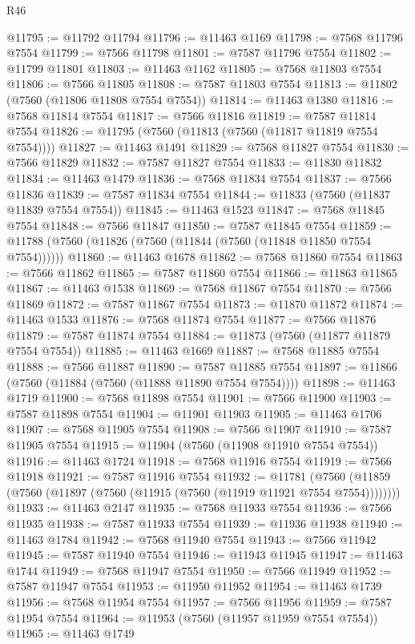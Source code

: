 \begin{lexlean}{R46}
\begin{coremodule}
@11795 := @11792 @11794
@11796 := @11463 @1169
@11798 := @7568 @11796 @7554
@11799 := @7566 @11798
@11801 := @7587 @11796 @7554
@11802 := @11799 @11801
@11803 := @11463 @1162
@11805 := @7568 @11803 @7554
@11806 := @7566 @11805
@11808 := @7587 @11803 @7554
@11813 := @11802 (@7560 (@11806 @11808 @7554 @7554))
@11814 := @11463 @1380
@11816 := @7568 @11814 @7554
@11817 := @7566 @11816
@11819 := @7587 @11814 @7554
@11826 := @11795 (@7560 (@11813 (@7560 (@11817 @11819 @7554 @7554))))
@11827 := @11463 @1491
@11829 := @7568 @11827 @7554
@11830 := @7566 @11829
@11832 := @7587 @11827 @7554
@11833 := @11830 @11832
@11834 := @11463 @1479
@11836 := @7568 @11834 @7554
@11837 := @7566 @11836
@11839 := @7587 @11834 @7554
@11844 := @11833 (@7560 (@11837 @11839 @7554 @7554))
@11845 := @11463 @1523
@11847 := @7568 @11845 @7554
@11848 := @7566 @11847
@11850 := @7587 @11845 @7554
@11859 := @11788 (@7560 (@11826 (@7560 (@11844 (@7560 (@11848 @11850 @7554 @7554))))))
@11860 := @11463 @1678
@11862 := @7568 @11860 @7554
@11863 := @7566 @11862
@11865 := @7587 @11860 @7554
@11866 := @11863 @11865
@11867 := @11463 @1538
@11869 := @7568 @11867 @7554
@11870 := @7566 @11869
@11872 := @7587 @11867 @7554
@11873 := @11870 @11872
@11874 := @11463 @1533
@11876 := @7568 @11874 @7554
@11877 := @7566 @11876
@11879 := @7587 @11874 @7554
@11884 := @11873 (@7560 (@11877 @11879 @7554 @7554))
@11885 := @11463 @1669
@11887 := @7568 @11885 @7554
@11888 := @7566 @11887
@11890 := @7587 @11885 @7554
@11897 := @11866 (@7560 (@11884 (@7560 (@11888 @11890 @7554 @7554))))
@11898 := @11463 @1719
@11900 := @7568 @11898 @7554
@11901 := @7566 @11900
@11903 := @7587 @11898 @7554
@11904 := @11901 @11903
@11905 := @11463 @1706
@11907 := @7568 @11905 @7554
@11908 := @7566 @11907
@11910 := @7587 @11905 @7554
@11915 := @11904 (@7560 (@11908 @11910 @7554 @7554))
@11916 := @11463 @1724
@11918 := @7568 @11916 @7554
@11919 := @7566 @11918
@11921 := @7587 @11916 @7554
@11932 := @11781
    (@7560 (@11859 (@7560 (@11897 (@7560 (@11915 (@7560 (@11919 @11921 @7554 @7554))))))))
@11933 := @11463 @2147
@11935 := @7568 @11933 @7554
@11936 := @7566 @11935
@11938 := @7587 @11933 @7554
@11939 := @11936 @11938
@11940 := @11463 @1784
@11942 := @7568 @11940 @7554
@11943 := @7566 @11942
@11945 := @7587 @11940 @7554
@11946 := @11943 @11945
@11947 := @11463 @1744
@11949 := @7568 @11947 @7554
@11950 := @7566 @11949
@11952 := @7587 @11947 @7554
@11953 := @11950 @11952
@11954 := @11463 @1739
@11956 := @7568 @11954 @7554
@11957 := @7566 @11956
@11959 := @7587 @11954 @7554
@11964 := @11953 (@7560 (@11957 @11959 @7554 @7554))
@11965 := @11463 @1749

\end{coremodule}
\end{lexlean}
